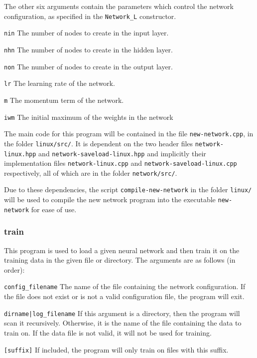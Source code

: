 \documentclass[a4paper]{article}
\begin{document}
The other six arguments contain the parameters which control the network configuration, as specified in the \lstinline{Network_L} constructor.

\lstinline{nin} The number of nodes to create in the input layer.

\lstinline{nhn} The number of nodes to create in the hidden layer.

\lstinline{non} The number of nodes to create in the output layer.

\lstinline{lr} The learning rate of the network.

\lstinline{m} The momentum term of the network.

\lstinline{iwm} The initial maximum of the weights in the network

The main code for this program will be contained in the file \lstinline{new-network.cpp}, in the folder \lstinline{linux/src/}. It is dependent on the two header files \lstinline{network-linux.hpp} and \lstinline{network-saveload-linux.hpp} and implicitly their implementation files \lstinline{network-linux.cpp} and \lstinline{network-saveload-linux.cpp} respectively, all of which are in the folder \lstinline{network/src/}.


Due to these dependencies, the script \lstinline{compile-new-network} in the folder \lstinline{linux/} will be used to compile the new network program into the executable \lstinline{new-network} for ease of use.

\subsubsection{train}
\label{subsubsec:dc_csa_train}

This program is used to load a given neural network and then train it on the training data in the given file or directory. The arguments are as follows (in order):

\lstinline{config_filename} The name of the file containing the network configuration. If the file does not exist or is not a valid configuration file, the program will exit.

\lstinline{dirname|log_filename} If this argument is a directory, then the program will scan it recursively. Otherwise, it is the name of the file containing the data to train on. If the data file is not valid, it will not be used for training.

\lstinline{[suffix]} If included, the program will only train on files with this suffix. 
\end{document}
